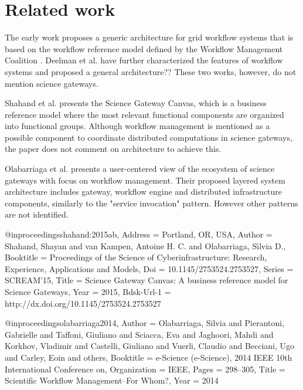 \section{Related work}
\label{sec:related}

 
The early work \cite{yuTaxonomy} proposes a generic architecture for grid workflow systems that is based on the workflow reference model defined by the Workflow Management Coalition \cite{wfRefModel}. 
Deelman et al. \cite{deelmanFGCS} have further characterized the features of workflow systems and proposed a general architecture?? 
These two works, however, do not mention science gateways.

Shahand et al. \cite{shahand:2015ab} presents the Science Gateway Canvas, which is a business reference model where the most relevant functional components are organized into functional groups. Although workflow management is mentioned as a possible  component to coordinate distributed computations in science gateways, the paper does not comment on architecture to achieve this.

Olabarriaga et al. \cite{olabarriaga2014} presents a user-centered view of the ecosystem of science gateways with focus on workflow management. Their proposed layered system architecture includes gateway, workflow engine and distributed infrastructure components, similarly to the "service invocation" pattern. However other patterns are not identified.





@inproceedings{shahand:2015ab,
	Address = {Portland, OR, USA},
	Author = {Shahand, Shayan and van Kampen, Antoine H. C. and Olabarriaga, S\'{\i}lvia D.},
	Booktitle = {{Proceedings of the Science of Cyberinfrastructure: Research, Experience, Applications and Models}},
	Doi = {10.1145/2753524.2753527},
	Series = {SCREAM'15},
	Title = {{Science Gateway Canvas: A business reference model for Science Gateways}},
	Year = {2015},
	Bdsk-Url-1 = {http://dx.doi.org/10.1145/2753524.2753527}}

@inproceedings{olabarriaga2014,
	Author = {Olabarriaga, Silvia and Pierantoni, Gabrielle and Taffoni, Giuliano and Sciacca, Eva and Jaghoori, Mahdi and Korkhov, Vladimir and Castelli, Giuliano and Vuerli, Claudio and Becciani, Ugo and Carley, Eoin and others},
	Booktitle = {e-Science (e-Science), 2014 IEEE 10th International Conference on},
	Organization = {IEEE},
	Pages = {298--305},
	Title = {Scientific Workflow Management--For Whom?},
	Year = {2014}}